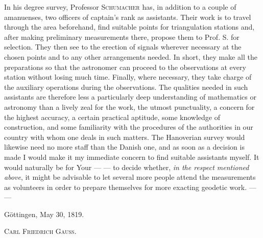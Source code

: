 In his degree survey, Professor \textsc{Schumacher} has, in addition to a couple of amanuenses, two officers of captain’s rank as assistants. Their work is to travel through the area beforehand, find suitable points for triangulation stations and, after making preliminary measurements there, propose them to Prof. S. for selection. They then see to the erection of signals wherever necessary at the chosen points and to any other arrangements needed. In short, they make all the preparations so that the astronomer can proceed to the observations at every station without losing much time. Finally, where necessary, they take charge of the auxiliary operations during the observations. The qualities needed in such assistants are therefore less a particularly deep understanding of mathematics or astronomy than a lively zeal for the work, the utmost punctuality, a concern for the highest accuracy, a certain practical aptitude, some knowledge of construction, and some familiarity with the procedures of the authorities in our country with whom one deals in such matters. The Hanoverian survey would likewise need no more staff than the Danish one, and as soon as a decision is made I would make it my immediate concern to find suitable assistants myself. It would naturally be for Your — — to decide whether, \textit{in the respect mentioned above}, it might be advisable to let several more people attend the measurements as volunteers in order to prepare themselves for more exacting geodetic work. — —

Göttingen, May 30, 1819.
\begin{flushright}\textsc{Carl Friedrich Gauss}.\end{flushright}

